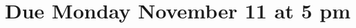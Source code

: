 \documentclass[11pt,fleqn]{article}
\begin{document}
\maketitle
\section*{Due Monday November 11 at 5 pm}










\end{document}
